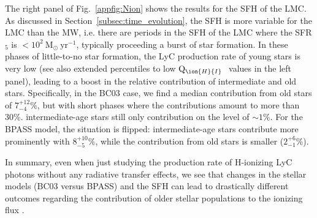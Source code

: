 \documentclass[fleqn,usenatbib]{mnras}
\newcommand\HI{\ion{H}{I}~} %
\begin{document}
The right panel of Fig.~\ref{appfig:Nion} shows the results for the SFH of the LMC. As discussed in Section~\ref{subsec:time_evolution}, the SFH is more variable for the LMC than the MW, i.e. there are periods in the SFH of the LMC where the SFR$_5$ is $<10^2~\mathrm{M}_{\odot}~\mathrm{yr}^{-1}$, typically proceeding a burst of star formation. In these phases of little-to-no star formation, the LyC production rate of young stars is very low (see also extended percentiles to low $\mathrm{Q}_{\HI}$ values in the left panel), leading to a boost in the relative contribution of intermediate and old stars. Specifically, in the BC03 case, we find a median contribution from old stars of $7_{-4}^{+12}\%$, but with short phases where the contributions amount to more than 30\%. intermediate-age stars still only contribution on the level of $\sim1\%$. For the BPASS model, the situation is flipped: intermediate-age stars contribute more prominently with $8_{-5}^{+10}\%$, while the contribution from old stars is smaller ($2_{-1}^{+6}\%$).

In summary, even when just studying the production rate of H-ionizing LyC photons without any radiative transfer effects, we see that changes in the stellar models (BC03 versus BPASS) and the SFH can lead to drastically different outcomes regarding the contribution of older stellar populations to the ionizing flux \citep[see also, e.g.,][]{choi17, rosdahl18, ma20}.





\bsp	%
\label{lastpage}
\end{document}
